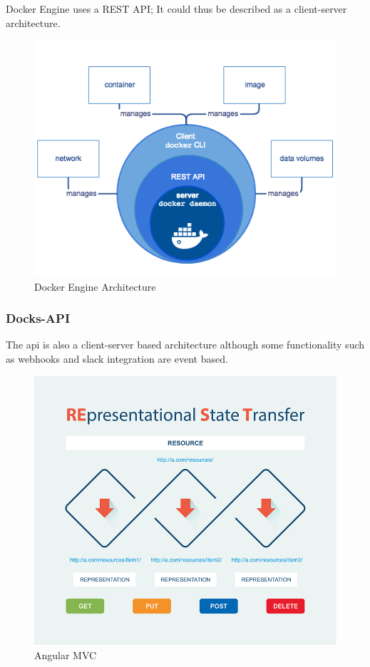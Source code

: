 \documentclass[]{article}
\begin{document}
Docker Engine uses a REST API; It could thus be described as a client-server architecture.

\begin{figure}[H]
	\centering
	\includegraphics[scale=0.5]{engine-components-flow.png}
	\caption{Docker Engine Architecture}
\end{figure}

\subsubsection{Docks-API}

The api is also a client-server based architecture although some functionality such as webhooks and slack integration are event based.

\begin{figure}[H]
	\centering
	\includegraphics[scale=0.4]{rest-working.png}
	\caption{Angular MVC}
\end{figure}
\end{document}
